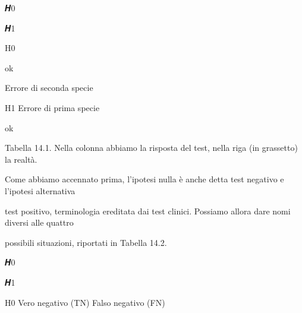 \documentclass[a4paper,portrait,12pt]{article}
\begin{document}
\begin{flushleft}
𝑯0
\end{flushleft}


\begin{flushleft}
𝑯1
\end{flushleft}


\begin{flushleft}
H0
\end{flushleft}


\begin{flushleft}
ok
\end{flushleft}


\begin{flushleft}
Errore di seconda specie
\end{flushleft}


\begin{flushleft}
H1 Errore di prima specie
\end{flushleft}


\begin{flushleft}
ok
\end{flushleft}


\begin{flushleft}
Tabella 14.1. Nella colonna abbiamo la risposta del test, nella riga (in grassetto) la realt\`{a}.
\end{flushleft}





\begin{flushleft}
Come abbiamo accennato prima, l'ipotesi nulla \`{e} anche detta test negativo e l'ipotesi alternativa
\end{flushleft}


\begin{flushleft}
test positivo, terminologia ereditata dai test clinici. Possiamo allora dare nomi diversi alle quattro
\end{flushleft}


\begin{flushleft}
possibili situazioni, riportati in Tabella 14.2.
\end{flushleft}


\begin{flushleft}
𝑯0
\end{flushleft}


\begin{flushleft}
𝑯1
\end{flushleft}


\begin{flushleft}
H0 Vero negativo (TN) Falso negativo (FN)
\end{flushleft}
\end{document}
